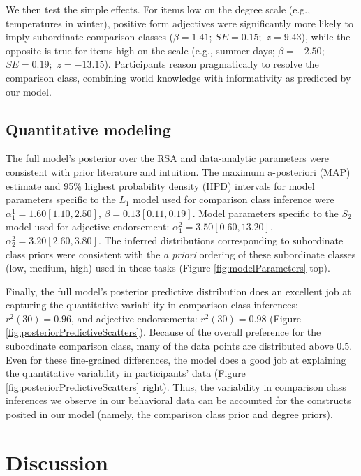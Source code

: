 \documentclass[doc]{apa6}
\begin{document}
We then test the simple effects. For items low on the degree scale (e.g., temperatures in winter), positive form adjectives were significantly more likely to imply subordinate comparison classes (\(\beta = 1.41\); \(SE = 0.15;\) \(z = 9.43\)), while the opposite is true for items high on the scale (e.g., summer days; \(\beta = -2.50\); \(SE = 0.19;\) \(z = -13.15\)). Participants reason pragmatically to resolve the comparison class, combining world knowledge with informativity as predicted by our model.

\subsection{Quantitative modeling}


The full model's posterior over the RSA and data-analytic parameters were consistent with prior literature and intuition. The maximum a-posteriori (MAP) estimate and 95\% highest probability density (HPD) intervals for model parameters specific to the \(L_1\) model used for comparison class inference were \(\alpha^{1}_{1} = 1.60 [1.10, 2.50]\), \(\beta = 0.13 [0.11, 0.19]\). Model parameters specific to the \(S_2\) model used for adjective endorsement: \(\alpha^{2}_{1} = 3.50 [0.60, 13.20]\), \(\alpha^{2}_{2} = 3.20 [2.60, 3.80]\). The inferred distributions corresponding to subordinate class priors were consistent with the \emph{a priori} ordering of these subordinate classes (low, medium, high) used in these tasks (Figure \ref{fig:modelParameters} top).

Finally, the full model's posterior predictive distribution does an excellent job at capturing the quantitative variability in comparison class inferences: \(r^2(30) = 0.96\), and adjective endorsements: \(r^2(30) = 0.98\) (Figure \ref{fig:posteriorPredictiveScatters}). Because of the overall preference for the subordinate comparison class, many of the data points are distributed above 0.5. Even for these fine-grained differences, the model does a good job at explaining the quantitative variability in participants' data (Figure \ref{fig:posteriorPredictiveScatters} right). Thus, the variability in comparison class inferences we observe in our behavioral data can be accounted for the constructs posited in our model (namely, the comparison class prior and degree priors).

\section{Discussion}
\end{document}
